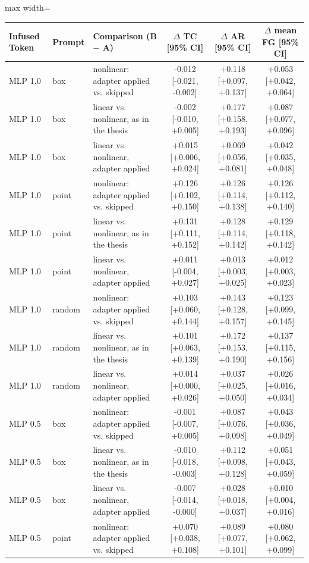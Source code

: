\begin{table}[htbp]
\centering
\small
\begin{adjustbox}{max width=\linewidth}
\begin{tabular}{lllccc}
\toprule
Infused Token & Prompt & Comparison (B $-$ A) & $\Delta$ TC [95\% CI] & $\Delta$ AR [95\% CI] & $\Delta$ mean FG [95\% CI] \\
\midrule
MLP 1.0 & box & nonlinear: adapter applied vs. skipped & -0.012 [-0.021, -0.002] & +0.118 [+0.097, +0.137] & +0.053 [+0.042, +0.064] \\
MLP 1.0 & box & linear vs. nonlinear, as in the thesis & -0.002 [-0.010, +0.005] & +0.177 [+0.158, +0.193] & +0.087 [+0.077, +0.096] \\
MLP 1.0 & box & linear vs. nonlinear, adapter applied & +0.015 [+0.006, +0.024] & +0.069 [+0.056, +0.081] & +0.042 [+0.035, +0.048] \\
\midrule
MLP 1.0 & point & nonlinear: adapter applied vs. skipped & +0.126 [+0.102, +0.150] & +0.126 [+0.114, +0.138] & +0.126 [+0.112, +0.140] \\
MLP 1.0 & point & linear vs. nonlinear, as in the thesis & +0.131 [+0.111, +0.152] & +0.128 [+0.114, +0.142] & +0.129 [+0.118, +0.142] \\
MLP 1.0 & point & linear vs. nonlinear, adapter applied & +0.011 [-0.004, +0.027] & +0.013 [+0.003, +0.025] & +0.012 [+0.003, +0.023] \\
\midrule
MLP 1.0 & random & nonlinear: adapter applied vs. skipped & +0.103 [+0.060, +0.144] & +0.143 [+0.128, +0.157] & +0.123 [+0.099, +0.145] \\
MLP 1.0 & random & linear vs. nonlinear, as in the thesis & +0.101 [+0.063, +0.139] & +0.172 [+0.153, +0.190] & +0.137 [+0.115, +0.156] \\
MLP 1.0 & random & linear vs. nonlinear, adapter applied & +0.014 [+0.000, +0.026] & +0.037 [+0.025, +0.050] & +0.026 [+0.016, +0.034] \\
\midrule
MLP 0.5 & box & nonlinear: adapter applied vs. skipped & -0.001 [-0.007, +0.005] & +0.087 [+0.076, +0.098] & +0.043 [+0.036, +0.049] \\
MLP 0.5 & box & linear vs. nonlinear, as in the thesis & -0.010 [-0.018, -0.003] & +0.112 [+0.098, +0.128] & +0.051 [+0.043, +0.059] \\
MLP 0.5 & box & linear vs. nonlinear, adapter applied & -0.007 [-0.014, -0.000] & +0.028 [+0.018, +0.037] & +0.010 [+0.004, +0.016] \\
\midrule
MLP 0.5 & point & nonlinear: adapter applied vs. skipped & +0.070 [+0.038, +0.108] & +0.089 [+0.077, +0.101] & +0.080 [+0.062, +0.099] \\

\end{tabular}
\end{adjustbox}
\end{table}
